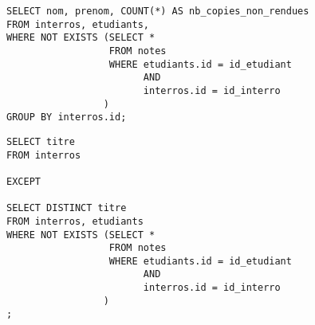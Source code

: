 \medskip{}

\question{}
\begin{lstlisting}
SELECT nom, prenom, COUNT(*) AS nb_copies_non_rendues
FROM interros, etudiants,
WHERE NOT EXISTS (SELECT *
                  FROM notes
                  WHERE etudiants.id = id_etudiant
                        AND
                        interros.id = id_interro
                 )
GROUP BY interros.id;
\end{lstlisting}

\medskip{}

\question{}
\begin{lstlisting}
SELECT titre
FROM interros

EXCEPT 

SELECT DISTINCT titre 
FROM interros, etudiants
WHERE NOT EXISTS (SELECT *
                  FROM notes
                  WHERE etudiants.id = id_etudiant
                        AND
                        interros.id = id_interro
                 )
;
\end{lstlisting}


